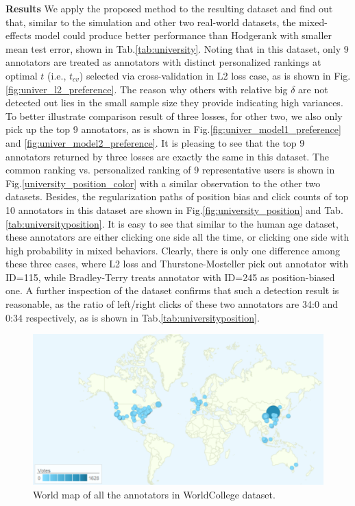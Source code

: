 \documentclass[10pt,journal,cspaper,compsoc]{IEEEtran}
\begin{document}
{\textbf{Results} We apply the proposed method to
the resulting dataset and find out that, similar to the simulation and other two real-world datasets, the mixed-effects model could produce better performance than Hodgerank with smaller mean test error, shown in Tab.\ref{tab:university}. Noting that in this dataset, only 9 annotators are treated as annotators with distinct personalized rankings at optimal $t$ (i.e., $t_{cv}$) selected via cross-validation in L2 loss case, as is shown in Fig.\ref{fig:univer_l2_preference}. The reason why others with relative big $\delta$ are not detected out lies in the small sample size they provide indicating high variances. To better illustrate comparison result of three losses, for other two, we also only pick up the top 9 annotators, as is shown in Fig.\ref{fig:univer_model1_preference} and \ref{fig:univer_model2_preference}. It is pleasing to see that the top 9 annotators returned by three losses are exactly the same in this dataset.
The common ranking vs. personalized ranking of 9 representative users is shown in Fig.\ref{university_position_color} with a similar observation to the other two datasets.
Besides, the regularization paths of position bias and click counts of top 10 annotators in this dataset are shown in Fig.\ref{fig:university_position} and Tab.\ref{tab:universityposition}.
It is easy to see that similar to the human age dataset, these annotators are either clicking one
side all the time, or clicking one side with high probability in mixed behaviors. Clearly, there is only one difference among these three cases, where L2 loss and Thurstone-Mosteller pick out annotator with ID=115, while Bradley-Terry treats annotator with ID=245 as position-biased one.
A further inspection of the dataset
confirms that such a detection result is reasonable, as the ratio of left/right clicks of these two annotators are 34:0 and 0:34 respectively, as is shown in Tab.\ref{tab:universityposition}.

\begin{figure}[h]
 \begin{center}
\includegraphics[width=0.55\linewidth]{map.png}
  \caption{World map of all the annotators in WorldCollege dataset.} \label{map}
\end{center}
\end{figure}

}
\end{document}
